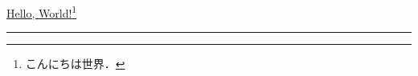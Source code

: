 \documentclass{jsarticle}
\begin{document}
\href{http://example.org/}{Hello, World!}\footnote{こんにちは世界．}

\rule{10pt}{10pt}
\end{document}
